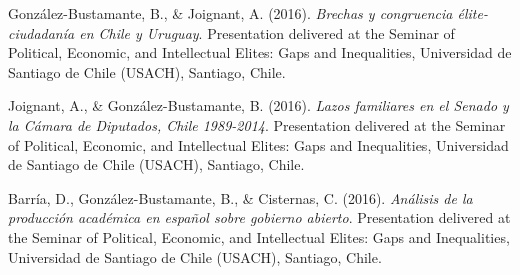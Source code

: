 \begin{publications}
\begin{benumerate}{87}

\item{González-Bustamante, B., \& Joignant, A. (2016). {\itshape Brechas y congruencia élite-ciudadanía en Chile y Uruguay}. Presentation delivered at the Seminar of Political, Economic, and Intellectual Elites: Gaps and Inequalities, Universidad de Santiago de Chile (USACH), Santiago, Chile.}\vspace{1mm}


\item{Joignant, A., \& González-Bustamante, B. (2016). {\itshape Lazos familiares en el Senado y la Cámara de Diputados, Chile 1989-2014}. Presentation delivered at the Seminar of Political, Economic, and Intellectual Elites: Gaps and Inequalities, Universidad de Santiago de Chile (USACH), Santiago, Chile.}\vspace{1mm}


\item{Barría, D., González-Bustamante, B., \& Cisternas, C. (2016). {\itshape Análisis de la producción académica en español sobre gobierno abierto}. Presentation delivered at the Seminar of Political, Economic, and Intellectual Elites: Gaps and Inequalities, Universidad de Santiago de Chile (USACH), Santiago, Chile.}\vspace{1mm}


\end{benumerate}
\end{publications}
